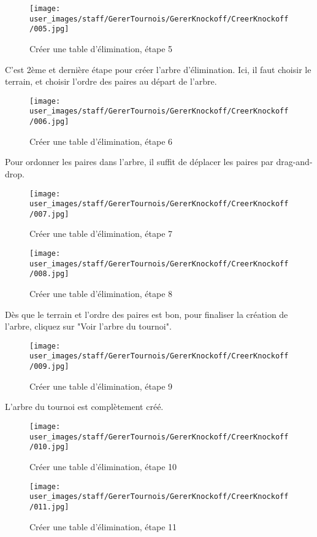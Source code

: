 \begin{figure}[H]
\centering
\texttt{[image: user\_images/staff/GererTournois/GererKnockoff/CreerKnockoff/005.jpg]}
\caption{Créer une table d'élimination, étape 5}
\end{figure}

C'est 2ème et dernière étape pour créer l'arbre d'élimination. Ici, il faut choisir le terrain, et choisir l'ordre des paires au départ de l'arbre.

\begin{figure}[H]
\centering
\texttt{[image: user\_images/staff/GererTournois/GererKnockoff/CreerKnockoff/006.jpg]}
\caption{Créer une table d'élimination, étape 6}
\end{figure}

Pour ordonner les paires dans l'arbre, il suffit de déplacer les paires par drag-and-drop.

\begin{figure}[H]
\centering
\texttt{[image: user\_images/staff/GererTournois/GererKnockoff/CreerKnockoff/007.jpg]}
\caption{Créer une table d'élimination, étape 7}
\end{figure}

\begin{figure}[H]
\centering
\texttt{[image: user\_images/staff/GererTournois/GererKnockoff/CreerKnockoff/008.jpg]}
\caption{Créer une table d'élimination, étape 8}
\end{figure}

Dès que le terrain et l'ordre des paires est bon, pour finaliser la création de l'arbre, cliquez sur "Voir l'arbre du tournoi".

\begin{figure}[H]
\centering
\texttt{[image: user\_images/staff/GererTournois/GererKnockoff/CreerKnockoff/009.jpg]}
\caption{Créer une table d'élimination, étape 9}
\end{figure}

L'arbre du tournoi est complètement créé.

\begin{figure}[H]
\centering
\texttt{[image: user\_images/staff/GererTournois/GererKnockoff/CreerKnockoff/010.jpg]}
\caption{Créer une table d'élimination, étape 10}
\end{figure}

\begin{figure}[H]
\centering
\texttt{[image: user\_images/staff/GererTournois/GererKnockoff/CreerKnockoff/011.jpg]}
\caption{Créer une table d'élimination, étape 11}
\end{figure}

